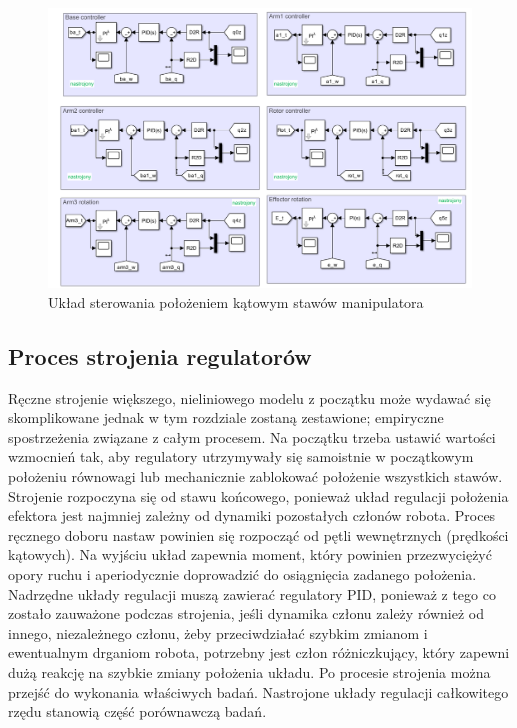 \documentclass[journal,twoside,web]{ieeecolor}
\begin{document}
\begin{figure}[hbt!]
	\centering
	\includegraphics[width=1\linewidth]{../figs/ster}
	\caption{Układ sterowania położeniem kątowym stawów manipulatora}
	\label{fig:ster}
\end{figure}
 
\subsection{Proces strojenia regulatorów}

Ręczne strojenie większego, nieliniowego modelu z początku może wydawać się skomplikowane jednak w tym rozdziale zostaną zestawione; empiryczne spostrzeżenia związane z całym procesem. Na początku trzeba ustawić wartości wzmocnień tak, aby regulatory utrzymywały się samoistnie w początkowym położeniu równowagi lub mechanicznie zablokować położenie wszystkich stawów. Strojenie rozpoczyna się od stawu końcowego, ponieważ układ regulacji położenia efektora jest najmniej zależny od dynamiki pozostałych członów robota. Proces ręcznego doboru nastaw powinien się rozpocząć od pętli wewnętrznych (prędkości kątowych). Na wyjściu układ zapewnia moment, który powinien przezwyciężyć opory ruchu i aperiodycznie doprowadzić do osiągnięcia zadanego położenia. Nadrzędne układy regulacji muszą zawierać regulatory PID, ponieważ z tego co zostało zauważone podczas strojenia, jeśli dynamika członu zależy również od innego, niezależnego członu, żeby przeciwdziałać szybkim zmianom i ewentualnym drganiom robota, potrzebny jest człon różniczkujący, który zapewni dużą reakcję na szybkie zmiany położenia układu. Po procesie strojenia można przejść do wykonania właściwych badań. Nastrojone układy regulacji całkowitego rzędu stanowią część porównawczą badań. 
\end{document}
